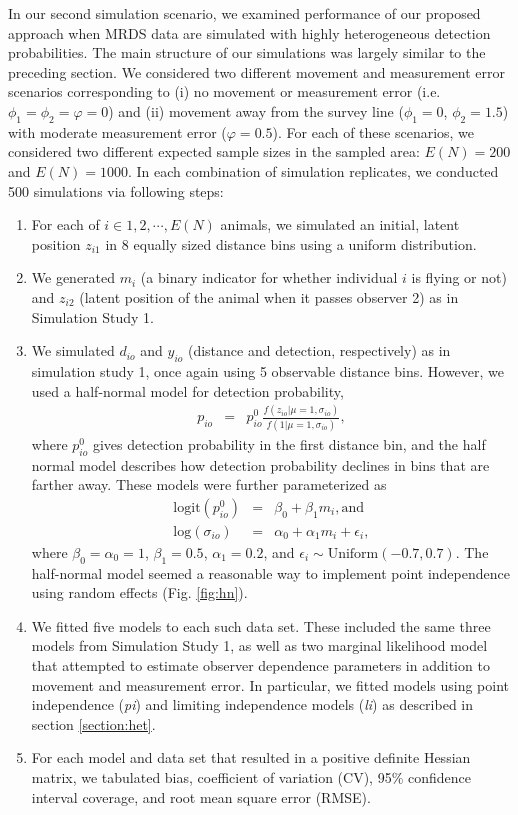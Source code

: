 \documentclass[aoas,preprint]{imsart}
\numberwithin{equation}{section}
\theoremstyle{plain}
\begin{document}
In our second simulation scenario, we examined performance of our proposed approach when MRDS data are simulated with highly heterogeneous detection probabilities.  The main structure of our simulations was largely similar to the preceding section.  We considered two different movement and measurement error scenarios corresponding to (i) no movement or measurement error (i.e. $\phi_1=\phi_2=\varphi=0$) and (ii) movement away from the survey line ($\phi_1=0$, $\phi_2=1.5$) with moderate measurement error ($\varphi=0.5$). For each of these scenarios, we considered two different expected sample sizes in the sampled area: $E(N) = 200$ and $E(N)=1000$.  In each combination of simulation replicates, we conducted 500 simulations via following steps:
\begin{enumerate}
  \item For each of $i \in 1,2,\cdots,E(N)$ animals, we simulated an initial, latent position $z_{i1}$ in 8 equally sized distance bins using a uniform distribution.
  \item We generated $m_i$ (a binary indicator for whether individual $i$ is flying or not) and $z_{i2}$ (latent position of the animal when it passes observer 2) as in Simulation Study 1.
  \item We simulated $d_{io}$ and $y_{io}$ (distance and detection, respectively) as in simulation study 1, once again using 5 observable distance bins. However, we used a half-normal model for detection probability,
      \begin{eqnarray*}
        p_{io} & = & p_{io}^0 \frac{f(z_{io}|\mu=1,\sigma_{io})}{f(1|\mu=1,\sigma_{io})},
      \end{eqnarray*}
      where $p_{io}^0$ gives detection probability in the first distance bin, and the half normal model describes how detection probability declines in bins that are farther away. These models were further parameterized as
      \begin{eqnarray*}
        \text{logit}(p_{io}^0) & = & \beta_0 + \beta_1 m_i, \text{and} \\
        \text{log}(\sigma_{io}) & = & \alpha_0 + \alpha_1 m_i + \epsilon_i,
      \end{eqnarray*}
      where $\beta_0 = \alpha_0 = 1$, $\beta_1 = 0.5$, $\alpha_1 = 0.2$, and $\epsilon_i \sim \text{Uniform}(-0.7,0.7)$.  The half-normal model seemed a reasonable way to implement point independence \citep{LaakeBorchers2004} using random effects (Fig. \ref{fig:hn}).
  \item We fitted five models to each such data set.  These included the same three models from Simulation Study 1, as well as two marginal likelihood model that attempted to estimate observer dependence parameters in addition to movement and measurement error.  In particular, we fitted models using point independence (\textit{pi}) and limiting independence models (\textit{li}) as described in section \ref{section:het}. \\
  \item For each model and data set that resulted in a positive definite Hessian matrix, we tabulated bias, coefficient of variation (CV), 95\% confidence interval coverage, and root mean square error (RMSE).
\end{enumerate}
\end{document}
